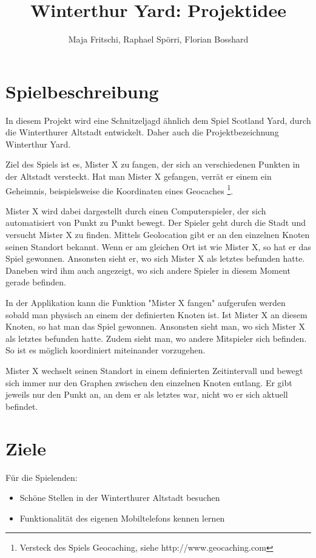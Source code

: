 \documentclass[11pt]{article}
\title{Winterthur Yard: Projektidee}
\author{Maja Fritschi, Raphael Spörri, Florian Bosshard}
\date{}
\begin{document}
\maketitle

\section{Spielbeschreibung}
In diesem Projekt wird eine Schnitzeljagd ähnlich dem Spiel Scotland Yard, durch die Winterthurer Altstadt entwickelt. Daher auch die Projektbezeichnung Winterthur Yard. 

Ziel des Spiels ist es, Mister X zu fangen, der sich an verschiedenen Punkten in der Altstadt versteckt. Hat man Mister X gefangen, verrät er einem ein Geheimnis, beispielsweise die Koordinaten eines Geocaches \footnote{Versteck des Spiels Geocaching, siehe http://www.geocaching.com}. 

Mister X wird dabei dargestellt durch einen Computerspieler, der sich automatisiert von Punkt zu Punkt bewegt. Der Spieler geht durch die Stadt und versucht Mister X zu finden. Mittels Geolocation gibt er an den einzelnen Knoten seinen Standort bekannt. Wenn er am gleichen Ort ist wie Mister X, so hat er das Spiel gewonnen. Ansonsten sieht er, wo sich Mister X als letztes befunden hatte. Daneben wird ihm auch angezeigt, wo sich andere Spieler in diesem Moment gerade befinden. 

In der Applikation kann die Funktion "Mister X fangen" aufgerufen werden sobald man physisch an einem der definierten Knoten ist. Ist Mister X an diesem Knoten, so hat man das Spiel gewonnen. Ansonsten sieht man, wo sich Mister X als letztes befunden hatte. Zudem sieht man, wo andere Mitspieler sich befinden. So ist es möglich koordiniert miteinander vorzugehen. 

Mister X wechselt seinen Standort in einem definierten Zeitintervall und bewegt sich immer nur den Graphen zwischen den einzelnen Knoten entlang. Er gibt jeweils nur den Punkt an, an dem er als letztes war, nicht wo er sich aktuell befindet. 

\section{Ziele}
Für die Spielenden:
\begin{itemize}
\item Schöne Stellen in der Winterthurer Altstadt besuchen
\item Funktionalität des eigenen Mobiltelefons kennen lernen
\end{itemize}
\end{document}
